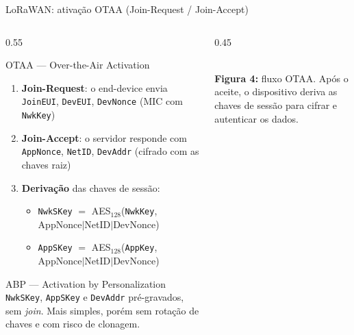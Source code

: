 \documentclass[aspectratio=169,11pt]{beamer}
\begin{document}
\begin{frame}{LoRaWAN: ativação OTAA (Join-Request / Join-Accept)}
  \footnotesize
  \begin{columns}
    \begin{column}{0.55\textwidth}
      \begin{block}{OTAA --- Over-the-Air Activation}
        \begin{enumerate}
          \item \textbf{Join-Request}: o end-device envia \texttt{JoinEUI}, \texttt{DevEUI}, \texttt{DevNonce} (MIC com \texttt{NwkKey})
          \item \textbf{Join-Accept}: o servidor responde com \texttt{AppNonce}, \texttt{NetID}, \texttt{DevAddr} (cifrado com as chaves raiz)
          \item \textbf{Derivação} das chaves de sessão:
            \begin{itemize}
              \item \texttt{NwkSKey} $=$ AES$_{128}$(\texttt{NwkKey},\, AppNonce$|$NetID$|$DevNonce)
              \item \texttt{AppSKey} $=$ AES$_{128}$(\texttt{AppKey},\, AppNonce$|$NetID$|$DevNonce)
            \end{itemize}
        \end{enumerate}
      \end{block}
      \pause
      \begin{alertblock}{ABP --- Activation by Personalization}
        \texttt{NwkSKey}, \texttt{AppSKey} e \texttt{DevAddr} pré-gravados, sem \emph{join}. Mais simples, porém sem rotação de chaves e com risco de clonagem.
      \end{alertblock}
    \end{column}
    \begin{column}{0.45\textwidth}
      \begin{center}
        \\[1mm]
        {\scriptsize \textbf{Figura 4:} fluxo OTAA. Após o aceite, o dispositivo deriva as chaves de sessão para cifrar e autenticar os dados.}
      \end{center}
    \end{column}
  \end{columns}
\end{frame}
\end{document}
